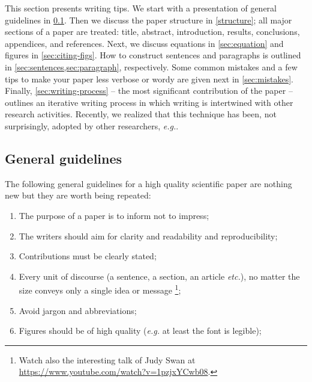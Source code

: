 \documentclass[authoryear,12pta4paper,fleqn]{article}
\makeatletter
\newcommand{\eg}{\textit{e.g.}\xspace}
\newcommand{\etc}{\textit{etc.}\@\xspace}
\numberwithin{equation}{section}
\theoremstyle{remark}
\makeatother
\begin{document}
This section presents  writing tips. We start with a presentation of general guidelines in \cref{sec:guidelines}. Then we  discuss the paper structure in \cref{structure};  all major sections of a paper are treated: title, abstract, introduction, results, conclusions, appendices, and references. Next, we discuss equations in
\cref{sec:equation} and figures in \cref{sec:citing-figs}. How to construct sentences and paragraphs is outlined in \cref{sec:sentences,sec:paragraph}, respectively.
Some common mistakes and a few tips to make your paper less verbose or wordy are given next in 
\cref{sec:mistakes}.  Finally, \cref{sec:writing-process} -- the most significant contribution of the paper -- outlines an iterative writing process in which writing is intertwined with other research activities. Recently, we realized that this technique has been, not surprisingly, adopted by other researchers, \eg \cite{Jones}.

\subsection{General guidelines}\label{sec:guidelines}

The following general guidelines for a high quality scientific paper are nothing new but they are worth being repeated:

\begin{enumerate}
\item The purpose of a paper is to inform not to impress;
\item The writers should aim for clarity and readability and  reproducibility;
\item Contributions must be clearly stated;
\item Every unit of discourse (a sentence, a section, an article \etc), no matter the size conveys only a single idea or message \citep{gopen1990science,savage2019novelist}\footnote{Watch also the interesting talk of Judy Swan at \url{https://www.youtube.com/watch?v=1pzjxYCwb08}.};
\item Avoid jargon and abbreviations;%
\item Figures should be of high quality (\eg at least the font is legible);
\end{enumerate}
\end{document}
